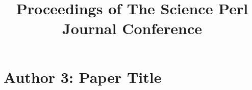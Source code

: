 \documentclass[10pt]{article}
\title{Proceedings of The Science Perl Journal Conference}
\author{}
\date{}
\begin{document}
\setlength{\footskip}{50pt} %

\section{Author 3: Paper Title}

\end{document}
